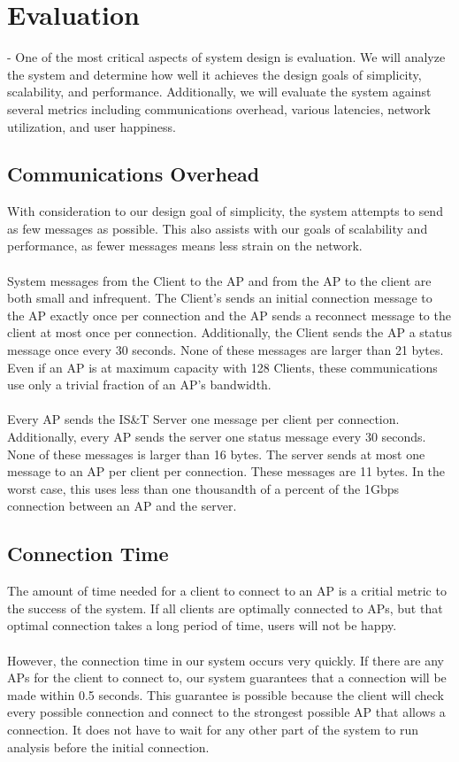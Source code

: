 \documentclass[10pt,journal,compsoc]{IEEEtran}
\begin{document}
\section{Evaluation}
 -		One of the most critical aspects of system design is evaluation. We will analyze the system and determine how well it achieves the design goals of simplicity, scalability, and performance. Additionally, we will evaluate the system against several metrics including communications overhead, various latencies, network utilization, and user happiness.
		
		\subsection{Communications Overhead}
		With consideration to our design goal of simplicity, the system attempts to send as few messages as possible. This also assists with our goals of scalability and performance, as fewer messages means less strain on the network.\\
		\\
		System messages from the Client to the AP and from the AP to the client are both small and infrequent. The Client's sends an initial connection message to the AP exactly once per connection and the AP sends a reconnect message to the client at most once per connection. Additionally, the Client sends the AP a status message once every 30 seconds. None of these messages are larger than 21 bytes. Even if an AP is at maximum capacity with 128 Clients, these communications use only a trivial fraction of an AP's bandwidth.\\
		\\
		Every AP sends the IS\&T Server one message per client per connection. Additionally, every AP sends the server one status message every 30 seconds. None of these messages is larger than 16 bytes. The server sends at most one message to an AP per client per connection. These messages are 11 bytes. In the worst case, this uses less than one thousandth of a percent of the 1Gbps connection between an AP and the server.
		
		\subsection{Connection Time}
		The amount of time needed for a client to connect to an AP is a critial metric to the success of the system. If all clients are optimally connected to APs, but that optimal connection takes a long period of time, users will not be happy.\\
		\\
		However, the connection time in our system occurs very quickly. If there are any APs for the client to connect to, our system guarantees that a connection will be made within 0.5 seconds. This guarantee is possible because the client will check every possible connection and connect to the strongest possible AP that allows a connection. It does not have to wait for any other part of the system to run analysis before the initial connection. 
		
\end{document}
